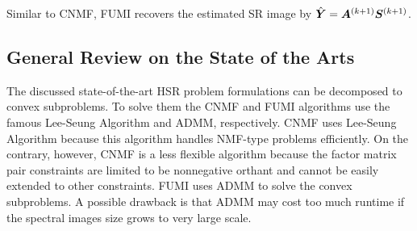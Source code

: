 \begin{algorithm}[H]
\begin{algorithmic}[1]
            \EndFor
        \EndFor
    \end{algorithmic}
\end{algorithm}
Similar to CNMF, FUMI recovers the estimated SR image by
$\hat{\bm Y} = \bm A^{(k+1)}\bm S^{(k+1)}$.

\subsection{General Review on the State of the Arts}
The discussed state-of-the-art HSR problem formulations can be decomposed to
convex subproblems.
To solve them the CNMF and FUMI algorithms use the famous Lee-Seung Algorithm
and ADMM, respectively.
CNMF uses Lee-Seung Algorithm because this algorithm handles NMF-type problems
efficiently.
On the contrary, however, CNMF is a less flexible algorithm because the factor
matrix pair constraints are limited to be nonnegative orthant and cannot be
easily extended to other constraints.
FUMI uses ADMM to solve the convex subproblems.
A possible drawback is that ADMM may cost too much runtime if the spectral
images size grows to very large scale.
